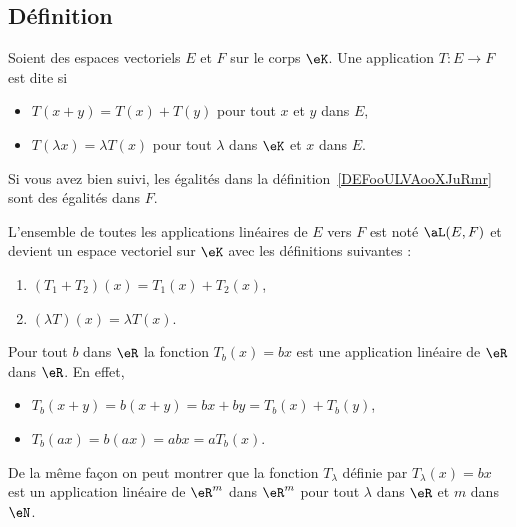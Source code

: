 \subsection{Définition}

\begin{definition}      \label{DEFooULVAooXJuRmr}
    Soient des espaces vectoriels \( E \) et \( F\) sur le corps \( \eK\). Une application \( T\colon E\to F\) est dite  si
    \begin{itemize}
        \item $T(x+y)=T(x)+T(y)$ pour tout $x$ et $y$ dans \( E\),
        \item $T(\lambda x)=\lambda T(x)$ pour tout $\lambda$ dans $\eK$ et \( x\) dans \( E\).
    \end{itemize}
\end{definition}
Si vous avez bien suivi, les égalités dans la définition~\ref{DEFooULVAooXJuRmr} sont des égalités dans \( F\).

\begin{lemmaDef} \label{DefDQRooVGbzSm}
    L'ensemble de toutes les applications linéaires de \( E\) vers \( F\) est noté \( \aL(E,F)\) et devient un espace vectoriel sur \( \eK\) avec les définitions suivantes :
    \begin{enumerate}
        \item
            \( (T_1+T_2)(x)=T_1(x)+T_2(x)\),
        \item
            \( (\lambda T)(x)=\lambda T(x)\).
    \end{enumerate}
\end{lemmaDef}

\begin{example}
Pour tout $b$ dans $\eR$ la fonction $T_b(x)= bx$ est une application linéaire de $\eR$ dans $\eR$. En effet,
\begin{itemize}
\item  $T_b(x+y)= b(x+y)= bx + by = T_b(x)+T_b(y)$,
\item $T_b(ax)=b(ax)= abx = a T_b(x)$.
\end{itemize}
De la même façon on peut montrer que la fonction $T_{\lambda}$ définie par $T_{\lambda}(x)=bx$ est un application linéaire de $\eR^m$ dans $\eR^m$ pour tout $\lambda$ dans $\eR$ et $m$ dans $\eN$.
\end{example}

